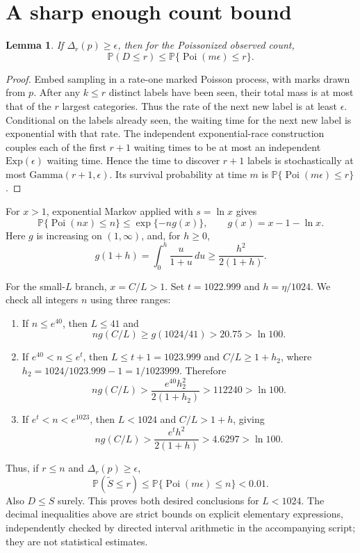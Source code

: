 \documentclass[11pt]{article}
\newtheorem{lemma}{Lemma}
\newcommand{\Prb}{\mathbb P}
\newcommand{\Poi}{\operatorname{Poi}}
\begin{document}
\section{A sharp enough count bound}
\begin{lemma}
If $\Delta_r(p)\ge\epsilon$, then for the Poissonized observed count,
\[
 \Prb(D\le r)\le\Prb\{\Poi(m\epsilon)\le r\}.
\]
\end{lemma}
\begin{proof}
Embed sampling in a rate-one marked Poisson process, with marks drawn from
$p$. After any $k\le r$ distinct labels have been seen, their total mass is
at most that of the $r$ largest categories. Thus the rate of the next new
label is at least $\epsilon$. Conditional on the labels already seen, the
waiting time for the next new label is exponential with that rate.
The independent exponential-race construction couples each of the first
$r+1$ waiting times to be at most an independent $\mathrm{Exp}(\epsilon)$
waiting time. Hence the time to discover $r+1$ labels is stochastically
at most $\mathrm{Gamma}(r+1,\epsilon)$. Its survival probability at time $m$
is $\Prb\{\Poi(m\epsilon)\le r\}$.
\end{proof}

For $x>1$, exponential Markov applied with $s=\ln x$ gives
\begin{equation}
 \Prb\{\Poi(nx)\le n\}
 \le \exp\{-n g(x)\},\qquad g(x)=x-1-\ln x.
 \label{eq:chernoff}
\end{equation}
Here $g$ is increasing on $(1,\infty)$, and, for $h\ge0$,
\begin{equation}
 g(1+h)=\int_0^h\frac{u}{1+u}\,du
 \ge\frac{h^2}{2(1+h)}.\label{eq:g}
\end{equation}

For the small-$L$ branch, $x=C/L>1$. Set $t=1022.999$ and
$h=\eta/1024$. We check all integers $n$ using three ranges:
\begin{enumerate}
\item If $n\le e^{40}$, then $L\le41$ and
\[
 ng(C/L)\ge g(1024/41)>20.75>\ln100.
\]
\item If $e^{40}<n\le e^t$, then $L\le t+1=1023.999$ and
$C/L\ge1+h_2$, where $h_2=1024/1023.999-1=1/1023999$. Therefore
\[
 ng(C/L)>\frac{e^{40}h_2^2}{2(1+h_2)}>112240>\ln100.
\]
\item If $e^t<n<e^{1023}$, then $L<1024$ and $C/L>1+h$, giving
\[
 ng(C/L)>\frac{e^t h^2}{2(1+h)}>4.6297>\ln100.
\]
\end{enumerate}
Thus, if $r\le n$ and $\Delta_r(p)\ge\epsilon$,
\[
 \Prb(\widetilde S\le r)\le\Prb\{\Poi(m\epsilon)\le n\}<0.01.
\]
Also $D\le S$ surely. This proves both desired conclusions for $L<1024$.
The decimal inequalities above are strict bounds on explicit elementary
expressions, independently checked by directed interval arithmetic in the
accompanying script; they are not statistical estimates.
\end{document}
